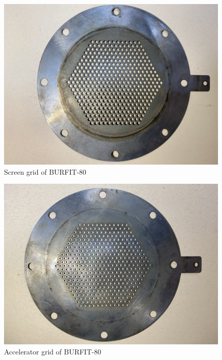 \begin{figure}[ht]
    \centering
    \includegraphics[scale=0.15]{fig/screen.jpeg}
    \caption{Screen grid of BURFIT-80}
    \label{fig:burfitscreen}
\end{figure}
\newpage
\begin{figure}[ht]
    \centering
    \includegraphics[scale=0.15]{fig/accel.jpeg}
    \caption{Accelerator grid of BURFIT-80}
    \label{fig:burfitaccel}
\end{figure}

